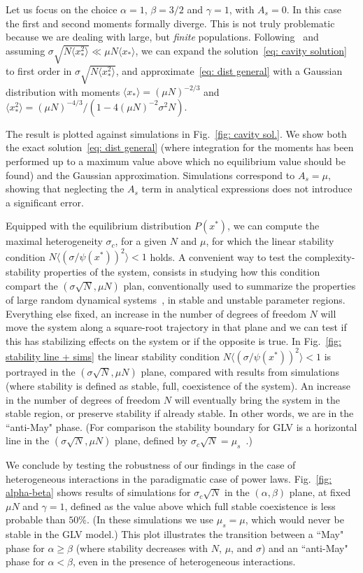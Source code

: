 Let us focus on the choice $\alpha=1$, $\beta=3/2$ and $\gamma=1$, with $A_s=0$.  
In this case the first and second moments formally diverge.
This is not truly problematic because we are dealing with large, but \emph{finite} populations.
Following~\cite{Cui2020,Hatton2023} and assuming $\sigma \sqrt{N\langle x_*^2\rangle}\ll \mu N \langle x_* \rangle$, we can expand the solution~\eqref{eq: cavity solution} to first order in $\sigma \sqrt{N\langle x_*^2\rangle}$, and approximate~\eqref{eq: dist general} with a Gaussian distribution with moments $\langle x_*\rangle=(\mu N)^{-2/3}$ and $\langle x_*^2\rangle=(\mu N)^{-4/3}/(1-4(\mu N)^{-2}\sigma^2N)$. 

The result is plotted against simulations in Fig.~\ref{fig: cavity sol.}. We show both the exact solution~\eqref{eq: dist general} (where integration for the moments has been performed up to a maximum value above which no equilibrium value should be found) and the Gaussian approximation.
Simulations correspond to $A_s=\mu$, showing that neglecting the $A_s$ term in analytical expressions does not introduce a significant error. 

Equipped with the equilibrium distribution $P(x^*)$, we can compute the maximal heterogeneity $\sigma_c$, for a given $N$ and $\mu$, for which the linear stability condition $N\langle (\sigma/\psi(x^*))^2\rangle < 1$ holds. 
A convenient way to test the complexity-stability properties of the system, consists in studying how this condition compart the $(\sigma \sqrt{N},\mu N)$ plan, conventionally used to summarize the properties of large random dynamical systems~\cite{bunin2017ecological}, in stable and unstable parameter regions. 
Everything else fixed, an increase in the number of degrees of freedom $N$ will move the system along a square-root trajectory in that plane and we can test if this has stabilizing effects on the system or if the opposite is true.
In Fig.~\ref{fig: stability line + sims} the linear stability condition $N\langle (\sigma/\psi(x^*))^2\rangle < 1$ is portrayed in the $(\sigma \sqrt{N},\mu N)$ plane, compared with results from simulations (where stability is defined as stable, full, coexistence of the system).
An increase in the number of degrees of freedom $N$ will eventually bring the system in the stable region, or preserve stability if already stable. 
In other words, we are in the ``anti-May" phase.
(For comparison the stability boundary for GLV is a horizontal line in the $(\sigma \sqrt{N},\mu N)$ plane, defined by $\sigma_c\sqrt{N} = \mu_s$~\cite{bunin2017ecological}.)

We conclude by testing the robustness of our findings in the case of heterogeneous interactions in the paradigmatic case of power laws. Fig.~\ref{fig: alpha-beta} shows results of simulations for $\sigma_c\sqrt{N}$ in the $(\alpha,\beta)$ plane, at fixed $\mu N$ and $\gamma = 1$, defined as the value above which full stable coexistence is less probable than $50\%$.
(In these simulations we use $\mu_s = \mu$, which would never be stable in the GLV model.) This plot illustrates the transition between a ``May" phase for $\alpha \geq \beta$ (where stability decreases with $N$, $\mu$, and $\sigma$) and an ``anti-May" phase for $\alpha < \beta$, even in the presence of heterogeneous interactions.